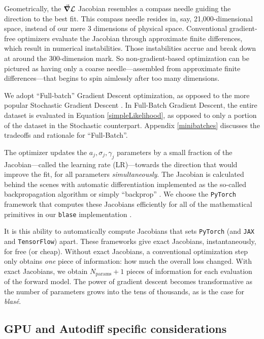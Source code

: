 \documentclass[twocolumn]{aastex631}
\begin{document}
Geometrically, the $\grad \mathcal{L}$ Jacobian resembles a compass needle guiding the direction to the best fit. This compass needle resides in, say, 21,000-dimensional space, instead of our mere 3 dimensions of physical space.  Conventional gradient-free optimizers evaluate the Jacobian through approximate finite differences, which result in numerical instabilities.  Those instabilities accrue and break down at around the 300-dimension mark.  So non-gradient-based optimization can be pictured as having only a coarse needle---assembled from approximate finite differences---that begins to spin aimlessly after too many dimensions.

We adopt ``Full-batch'' Gradient Descent optimization, as opposed to the more popular Stochastic Gradient Descent \citep[SGD,][]{2016arXiv160904747R}.  In Full-Batch Gradient Descent, the entire dataset is evaluated in Equation \ref{simpleLikelihood}, as opposed to only a portion of the dataset in the Stochastic counterpart.  Appendix \ref{minibatches} discusses the tradeoffs and rationale for ``Full-Batch''.

The optimizer updates the $a_j, \sigma_j, \gamma_j$ parameters by a small fraction of the Jacobian---called the learning rate (LR)---towards the direction that would improve the fit, for all parameters \emph{simultaneously}. The Jacobian is calculated behind the scenes with automatic differentiation implemented as the so-called backpropagation algorithm or simply ``backprop'' \citep{2015arXiv150205767G}. We choose the \texttt{PyTorch} framework that computes these Jacobians efficiently for all of the mathematical primitives in our \texttt{blase} implementation \citep{2019arXiv191201703P}.

It is this ability to automatically compute Jacobians that sets \texttt{PyTorch} (and \texttt{JAX} and \texttt{TensorFlow}) apart.  These frameworks give exact Jacobians, instantaneously, for free (or cheap).  Without exact Jacobians, a conventional optimization step only obtains \emph{one} piece of information: how much the overall loss changed.  With exact Jacobians, we obtain $N_\mathrm{params}+1$ pieces of information for each evaluation of the forward model.  The power of gradient descent becomes transformative as the number of parameters grows into the tens of thousands, as is the case for \emph{blas\'e}.

\subsection{GPU and Autodiff specific considerations}\label{gpuConsiderations}
\end{document}
